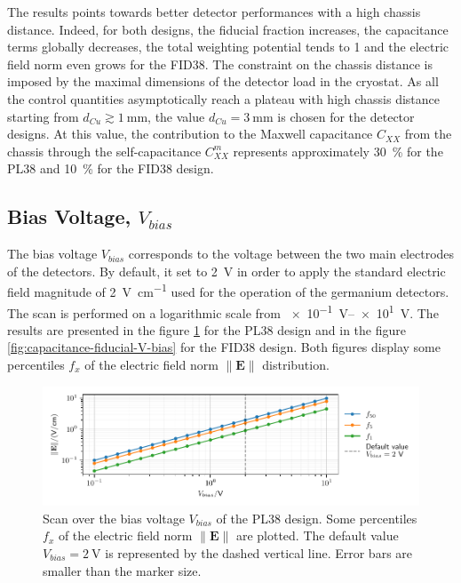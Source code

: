 The results points towards better detector performances with a high chassis distance. Indeed, for both designs, the fiducial fraction increases, the capacitance terms globally decreases, the total weighting potential tends to 1 and the electric field norm even grows for the FID38. The constraint on the chassis distance is imposed by the maximal dimensions of the detector load in the cryostat. As all the control quantities asymptotically reach a plateau with high chassis distance starting from $d_{Cu} \gtrsim \SI{1}{\mm}$, the value $d_{Cu} = \SI{3}{\mm}$ is chosen for the detector designs. At this value, the contribution to the Maxwell capacitance $C_{XX}$ from the chassis through the self-capacitance $C_{XX}^m$ represents approximately \SI{30}{\percent} for the PL38 and \SI{10}{\percent} for the FID38 design.



\subsection{Bias Voltage, $V_{bias}$}

The bias voltage $V_{bias}$ corresponds to the voltage between the two main electrodes of the detectors.
By default, it set to \SI{2}{\volt} in order to apply the standard electric field magnitude of \SI{2}{\volt\per\cm} used for the operation of the \Edelweiss{} germanium detectors. The scan is performed on a logarithmic scale from \SIrange{e-1}{e1}{\volt}. The results are presented in the figure \ref{fig:capacitance-fiducial-V-bias-pl38} for the PL38 design and in the figure \ref{fig:capacitance-fiducial-V-bias} for the FID38 design. Both figures display some percentiles $f_x$ of the electric field norm $\| \mathbf{E} \|$ distribution.

\begin{figure}
\centering
\includegraphics[scale=1]{Figures/ElectrodesScan/capacitance_fiducial_V_bias_pl38.pdf}
\caption{Scan over the bias voltage $V_{bias}$ of the PL38 design. Some percentiles $f_x$ of the electric field norm $\| \mathbf{E} \|$ are plotted. The default value $V_{bias}=\SI{2}{\volt}$ is represented by the dashed vertical line. Error bars are smaller than the marker size.}
\label{fig:capacitance-fiducial-V-bias-pl38}
\end{figure}


